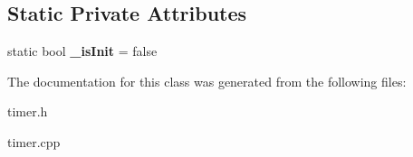 \subsection*{Static Private Attributes}
\begin{DoxyCompactItemize}
\item 
\mbox{\label{classTimer_a0a01a2bb877f90195f529562b5f34d9f}} 
static bool {\bfseries \+\_\+is\+Init} = false
\end{DoxyCompactItemize}


The documentation for this class was generated from the following files\+:\begin{DoxyCompactItemize}
\item 
timer.\+h\item 
timer.\+cpp\end{DoxyCompactItemize}
